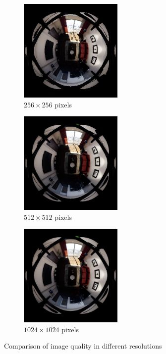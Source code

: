 \begin{figure}[!htb]
    \centering
    \begin{subfigure}{0.32\textwidth}
    \centering
        \includegraphics[height=5cm]{rapport/fig/Results/256to256.jpeg}
        \caption{$256 \times 256$ pixels}
        \label{fig:res_comp_256_to_256}
    \end{subfigure}
    \begin{subfigure}{0.32\textwidth}
        \centering
        \includegraphics[height=5cm]{rapport/fig/Results/512to512.jpeg}
        \caption{$512 \times 512$ pixels}
        \label{fig:res_comp_512_512}
    \end{subfigure}    
    \begin{subfigure}{0.32\textwidth}
        \centering
        \includegraphics[height=5cm]{rapport/fig/Results/1024to1024.jpeg}
        \caption{$1024 \times 1024$ pixels}
        \label{fig:res_comp_1024_1024}
    \end{subfigure}
    \centering
    \caption{Comparison of image quality in different resolutions}
    \label{fig:res_quality_comparison}
\end{figure}


